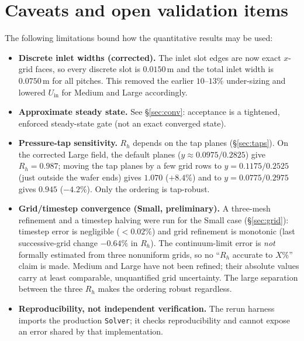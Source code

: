 \documentclass[11pt]{article}
\begin{document}
\section{Caveats and open validation items}\label{sec:caveats}
The following limitations bound how the quantitative results may be used:
\begin{itemize}\itemsep2pt
\item \textbf{Discrete inlet widths (corrected).} The inlet slot edges are now
exact $x$-grid faces, so every discrete slot is $0.0150\,$m and the total inlet
width is $0.0750\,$m for all pitches. This removed the earlier $10$--$13\%$
under-sizing and lowered $U_\mathrm{in}$ for Medium and Large accordingly.
\item \textbf{Approximate steady state.} See \S\ref{sec:conv}: acceptance is a
tightened, enforced steady-state gate (not an exact converged state).
\item \textbf{Pressure-tap sensitivity.} $R_h$ depends on the tap planes
(\S\ref{sec:taps}). On the corrected Large field, the default
planes ($y\approx0.0975/0.2825$) give $R_h=0.987$; moving the tap planes by a few
grid rows to $y=0.1175/0.2525$ (just outside the wafer ends) gives $1.070$
($+8.4\%$) and to $y=0.0775/0.2975$ gives $0.945$ ($-4.2\%$). Only the ordering
is tap-robust.
\item \textbf{Grid/timestep convergence (Small, preliminary).} A three-mesh
refinement and a timestep halving were run for the Small case (\S\ref{sec:grid}):
timestep error is negligible ($<0.02\%$) and grid refinement is monotonic (last
successive-grid change $-0.64\%$ in $R_h$). The continuum-limit error is
\emph{not} formally estimated from three nonuniform grids, so no ``$R_h$ accurate
to $X\%$'' claim is made. Medium and Large have not been refined; their absolute
values carry at least comparable, unquantified grid uncertainty. The large
separation between the three $R_h$ makes the ordering robust regardless.
\item \textbf{Reproducibility, not independent verification.} The rerun harness
imports the production \texttt{Solver}; it checks reproducibility and cannot
expose an error shared by that implementation.
\end{itemize}
\end{document}
